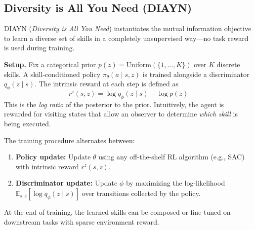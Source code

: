 \documentclass[11pt, letterpaper]{article}
\begin{document}
\subsection{Diversity is All You Need (DIAYN)}
 
\begin{concept}
    DIAYN (\textit{Diversity is All You Need}) instantiates the mutual information objective to learn a diverse set of skills in a completely unsupervised way---no task reward is used during training.
 
    \textbf{Setup.} Fix a categorical prior \(p(z) = \text{Uniform}(\{1, \dots, K\})\) over \(K\) discrete skills. A skill-conditioned policy \(\pi_\theta(a \mid s, z)\) is trained alongside a discriminator \(q_\phi(z \mid s)\). The intrinsic reward at each step is defined as
    \[
        r^z(s, z) = \log q_\phi(z \mid s) - \log p(z)
    \]
    This is the \textit{log ratio} of the posterior to the prior. Intuitively, the agent is rewarded for visiting states that allow an observer to determine \textit{which skill} is being executed.
 
    The training procedure alternates between:
    \begin{enumerate}
        \item \textbf{Policy update:} Update \(\theta\) using any off-the-shelf RL algorithm (e.g., SAC) with intrinsic reward \(r^z(s, z)\).
        \item \textbf{Discriminator update:} Update \(\phi\) by maximizing the log-likelihood \(\mathbb{E}_{s, z}[\log q_\phi(z \mid s)]\) over transitions collected by the policy.
    \end{enumerate}
 
    At the end of training, the learned skills can be composed or fine-tuned on downstream tasks with sparse environment reward.
\end{concept}
 
\end{document}
